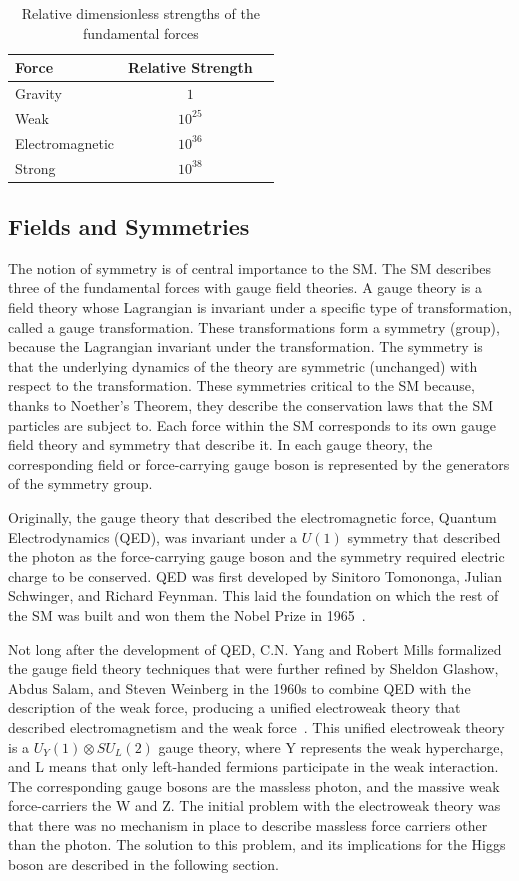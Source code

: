 \begin{table}[hbtp]
\centering
\caption{Relative dimensionless strengths of the fundamental forces}
\begin{tabular}{lcc}
\hline
Force & Relative Strength \\
\hline
Gravity & $1$ \\
Weak &  $10^{25}$ \\
Electromagnetic & $10^{36}$ \\
Strong & $10^{38}$ \\
\hline
\end{tabular}
\label{tab:force_table}
\end{table}


\subsection{Fields and Symmetries}
The notion of symmetry is of central importance to the SM.
The SM describes three of the fundamental forces with gauge field theories.
A gauge theory is a field theory whose Lagrangian is invariant under a specific type
of transformation, called a gauge transformation. These transformations form a symmetry (group), because the Lagrangian invariant under the transformation. The symmetry
is that the underlying dynamics of the theory are symmetric (unchanged) with respect to the transformation. These symmetries critical to the SM because, thanks to Noether's
Theorem, they describe the conservation laws that the SM particles are subject to. Each force within the SM corresponds to its own gauge field theory
and symmetry that describe it. In each gauge theory, the corresponding field or force-carrying gauge boson is represented by the generators of the symmetry group. 

Originally, the gauge theory that described the electromagnetic force, Quantum Electrodynamics (QED), was invariant under a $U(1)$ symmetry that described the photon as the
force-carrying gauge boson and the symmetry required electric charge to be conserved. QED was first developed by Sinitoro Tomononga, Julian Schwinger, and Richard Feynman.
This laid the foundation on which the rest of the SM was built and won them the Nobel Prize in 1965~\cite{QED}. 

Not long after the development of QED, C.N. Yang and Robert Mills formalized the gauge field theory techniques that were further refined by Sheldon Glashow, Abdus Salam,
and Steven Weinberg in the 1960s to combine QED
with the description of the weak force, producing a unified electroweak theory that described electromagnetism and the weak force~\cite{electroweak}. This unified electroweak theory is a
$U_{Y}(1) \otimes SU_{L}(2)$ gauge theory, where Y represents the weak hypercharge, and L means that only left-handed fermions participate in the weak interaction. 
The corresponding gauge bosons are the massless photon, and the massive weak force-carriers the W and Z. The initial problem with the electroweak theory was that there was no
mechanism in place to describe massless force carriers other than the photon. The solution to this problem, and its implications for the Higgs boson are described in the
following section.

